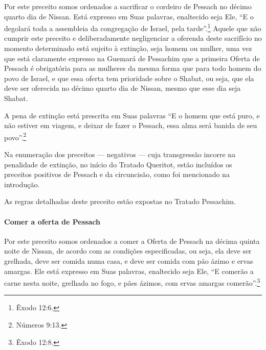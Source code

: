 \begin{multicols}{2}
Por este preceito somos ordenados a sacrificar o cordeiro de Pessach\starr{}
no décimo quarto dia de Nissan\starr. Está expresso em Suas palavras,
enaltecido seja Ele, ``E o degolará toda a assembleia da congregação de
Israel, pela tarde''.\footnote{Êxodo 12:6.} Aquele que não cumprir este preceito
e deliberadamente negligenciar a oferenda deste sacrifício no momento
determinado está sujeito à extinção, seja homem ou mulher, uma vez que
está claramente expresso na Guemará\starr{} de Pessachim\starr{} que a primeira Oferta
de Pessach\starr{} é obrigatória para as mulheres da mesma forma que para
todo homem do povo de Israel, e que essa oferta tem prioridade sobre o
Shabat, ou seja, que ela deve ser oferecida no décimo quarto dia de
Nissan\starr, mesmo que esse dia seja Shabat.

A pena de extinção está prescrita em Suas palavras ``E o homem que está
puro, e não estiver em viagem, e deixar de fazer o Pessach\starr, essa alma
será banida de seu povo''.\footnote{Números 9:13.}

Na enumeração dos preceitos --- negativos --- cuja transgressão incorre
na penalidade de extinção, no início do Tratado Queritot\starr, estão
incluídos os preceitos positivos de Pessach\starr{} e da circuncisão, como
foi mencionado na introdução.

As regras detalhadas deste preceito estão expostas no Tratado Pessachim\starr.

\paragraph{Comer a oferta de Pessach\starr{}}

Por este preceito somos ordenados a comer a Oferta de Pessach\starr{} na
décima quinta noite de Nissan\starr, de acordo com as condições especificadas,
ou seja, ela deve ser grelhada, deve ser comida numa casa, e deve ser
comida com pão ázimo e ervas amargas. Ele está expresso em Suas
palavras, enaltecido seja Ele, ``E comerão a carne nesta noite, grelhada
no fogo, e pães ázimos, com ervas amargas comerão''.\footnote{Êxodo 12:8.}


\end{multicols}

